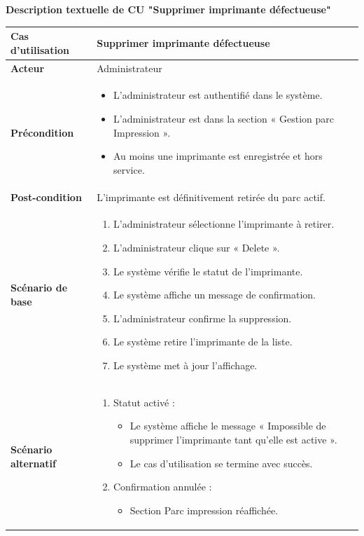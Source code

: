 \documentclass[a4paper,11pt]{report}
\begin{document}
\newpage
\textbf{Description textuelle de CU "Supprimer imprimante défectueuse"}

\begin{tabularx}{\textwidth}{|>{\bfseries}l|X|}
\hline
Cas d’utilisation    & Supprimer imprimante défectueuse \\
\hline
Acteur               & Administrateur \\
\hline
Précondition         &
\begin{itemize}[left=0pt]
  \item L’administrateur est authentifié dans le système.
  \item L’administrateur est dans la section « Gestion parc Impression ».
  \item Au moins une imprimante est enregistrée et hors service.
\end{itemize} \\
\hline
Post-condition       & L’imprimante est définitivement retirée du parc actif. \\
\hline
Scénario de base     &
\begin{enumerate}[left=0pt]
  \item L’administrateur sélectionne l’imprimante à retirer.
  \item L’administrateur clique sur « Delete ».
  \item Le système vérifie le statut de l’imprimante.
  \item Le système affiche un message de confirmation.
  \item L’administrateur confirme la suppression.
  \item Le système retire l’imprimante de la liste.
  \item Le système met à jour l’affichage.
\end{enumerate} \\
\hline
Scénario alternatif  &
\begin{enumerate}[label=\arabic*.a,wide=0pt]
  \item[3.a] Statut activé :
    \begin{itemize}[left=1em]
      \item Le système affiche le message « Impossible de supprimer l’imprimante tant qu’elle est active ».
      \item Le cas d’utilisation se termine avec succès.
    \end{itemize}
  \item[5.a] Confirmation annulée :
    \begin{itemize}[left=1em]
      \item Section Parc impression réaffichée.
    \end{itemize}
\end{enumerate} \\
\hline
\end{tabularx}
\end{document}
